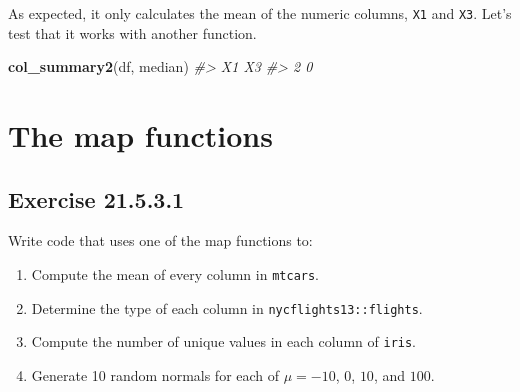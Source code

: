 \documentclass[]{book}
\newenvironment{Shaded}{\begin{snugshade}}{\end{snugshade}}
\newcommand{\CommentTok}[1]{\textcolor[rgb]{0.56,0.35,0.01}{\textit{#1}}}
\newcommand{\KeywordTok}[1]{\textcolor[rgb]{0.13,0.29,0.53}{\textbf{#1}}}
\newcommand{\NormalTok}[1]{#1}
\providecommand{\tightlist}{%
  \setlength{\itemsep}{0pt}\setlength{\parskip}{0pt}}
\theoremstyle{plain}
\theoremstyle{remark}
\begin{document}
As expected, it only calculates the mean of the numeric columns, \texttt{X1} and \texttt{X3}.
Let's test that it works with another function.

\begin{Shaded}
\begin{Highlighting}[]
\KeywordTok{col_summary2}\NormalTok{(df, median)}
\CommentTok{#> X1 X3 }
\CommentTok{#>  2  0}
\end{Highlighting}
\end{Shaded}

\hypertarget{the-map-functions}{%
\section{The map functions}\label{the-map-functions}}

\hypertarget{exercise-21.5.3.1}{%
\subsection*{\texorpdfstring{Exercise {21.5.3.1}}{Exercise 21.5.3.1}}\label{exercise-21.5.3.1}}

Write code that uses one of the map functions to:

\begin{enumerate}
\def\labelenumi{\arabic{enumi}.}
\tightlist
\item
  Compute the mean of every column in \texttt{mtcars}.
\item
  Determine the type of each column in \texttt{nycflights13::flights}.
\item
  Compute the number of unique values in each column of \texttt{iris}.
\item
  Generate 10 random normals for each of \(\mu = -10\), \(0\), \(10\), and \(100\).
\end{enumerate}
\end{document}
